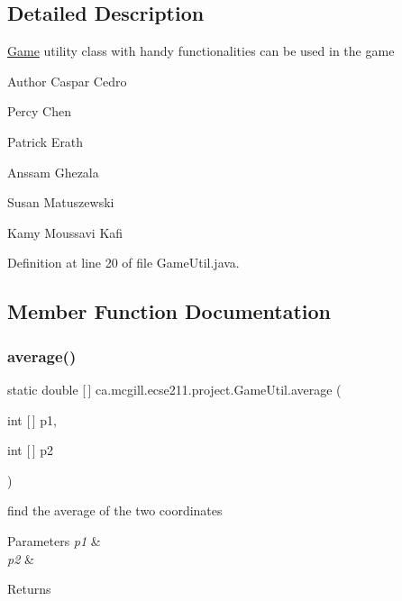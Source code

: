 \subsection{Detailed Description}
\hyperlink{enumca_1_1mcgill_1_1ecse211_1_1project_1_1_game}{Game} utility class with handy functionalities can be used in the game

\begin{DoxyAuthor}{Author}
Caspar Cedro 

Percy Chen 

Patrick Erath 

Anssam Ghezala 

Susan Matuszewski 

Kamy Moussavi Kafi 
\end{DoxyAuthor}


Definition at line 20 of file Game\+Util.\+java.



\subsection{Member Function Documentation}
\mbox{\label{classca_1_1mcgill_1_1ecse211_1_1project_1_1_game_util_ae5c5c445ab84516991219ca3783fcaa4}} 
\subsubsection{\texorpdfstring{average()}{average()}}
{\footnotesize\ttfamily static double \mbox{[}$\,$\mbox{]} ca.\+mcgill.\+ecse211.\+project.\+Game\+Util.\+average (\begin{DoxyParamCaption}\item[{int \mbox{[}$\,$\mbox{]}}]{p1,  }\item[{int \mbox{[}$\,$\mbox{]}}]{p2 }\end{DoxyParamCaption})\hspace{0.3cm}{\ttfamily [static]}}

find the average of the two coordinates


\begin{DoxyParams}{Parameters}
{\em p1} & \\
\hline
{\em p2} & \\
\hline
\end{DoxyParams}
\begin{DoxyReturn}{Returns}

\end{DoxyReturn}


